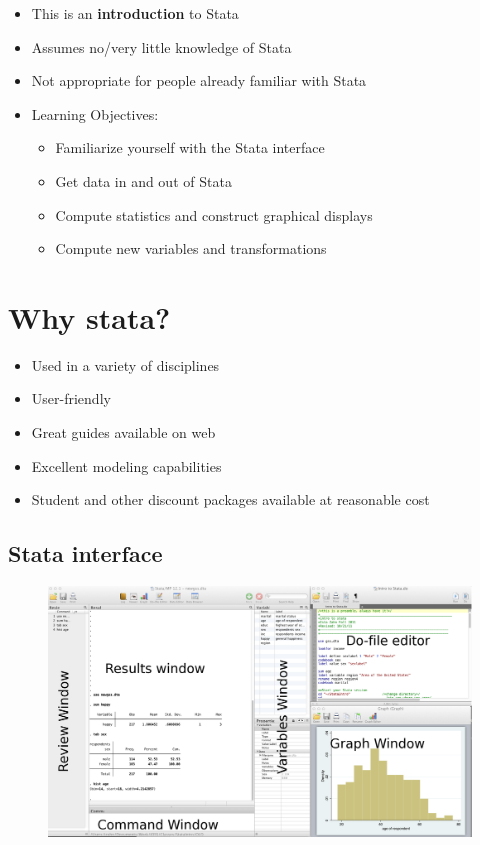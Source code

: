 \documentclass[]{book}
\providecommand{\tightlist}{%
  \setlength{\itemsep}{0pt}\setlength{\parskip}{0pt}}
\begin{document}
\begin{itemize}
\tightlist
\item
  This is an \textbf{introduction} to Stata
\item
  Assumes no/very little knowledge of Stata
\item
  Not appropriate for people already familiar with Stata
\item
  Learning Objectives:

  \begin{itemize}
  \tightlist
  \item
    Familiarize yourself with the Stata interface
  \item
    Get data in and out of Stata
  \item
    Compute statistics and construct graphical displays
  \item
    Compute new variables and transformations
  \end{itemize}
\end{itemize}

\section{Why stata?}\label{why-stata}

\begin{itemize}
\tightlist
\item
  Used in a variety of disciplines
\item
  User-friendly
\item
  Great guides available on web
\item
  Excellent modeling capabilities
\item
  Student and other discount packages available at reasonable cost
\end{itemize}

\subsection{Stata interface}\label{stata-interface}

\begin{figure}
\centering
\includegraphics{Stata/StataIntro/images/StataInterface.png}
\caption{}
\end{figure}
\end{document}
